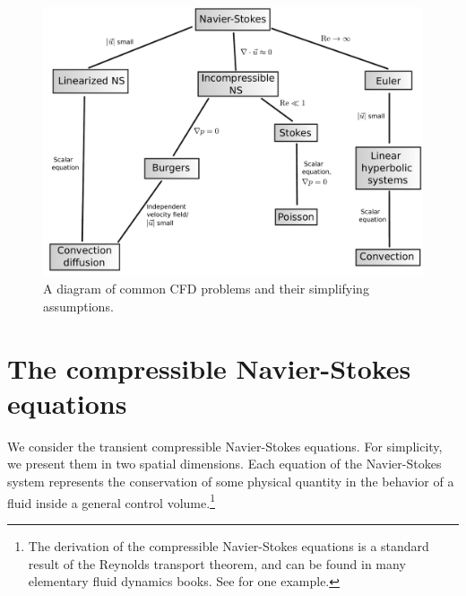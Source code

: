 

\begin{figure}[!h]
\centering
\includegraphics[scale=.45]{figs/CFD_tree.pdf}
\caption{A diagram of common CFD problems and their simplifying assumptions.}
\end{figure}

\section{The compressible Navier-Stokes equations}

We consider the transient compressible Navier-Stokes equations. For simplicity, we present them in two spatial dimensions. Each equation of the Navier-Stokes system represents the conservation of some physical quantity in the behavior of a fluid inside a general control volume.\footnote{The derivation of the compressible Navier-Stokes equations is a standard result of the Reynolds transport theorem, and can be found in many elementary fluid dynamics books. See \cite{Emanuel:994127} for one example.} 

